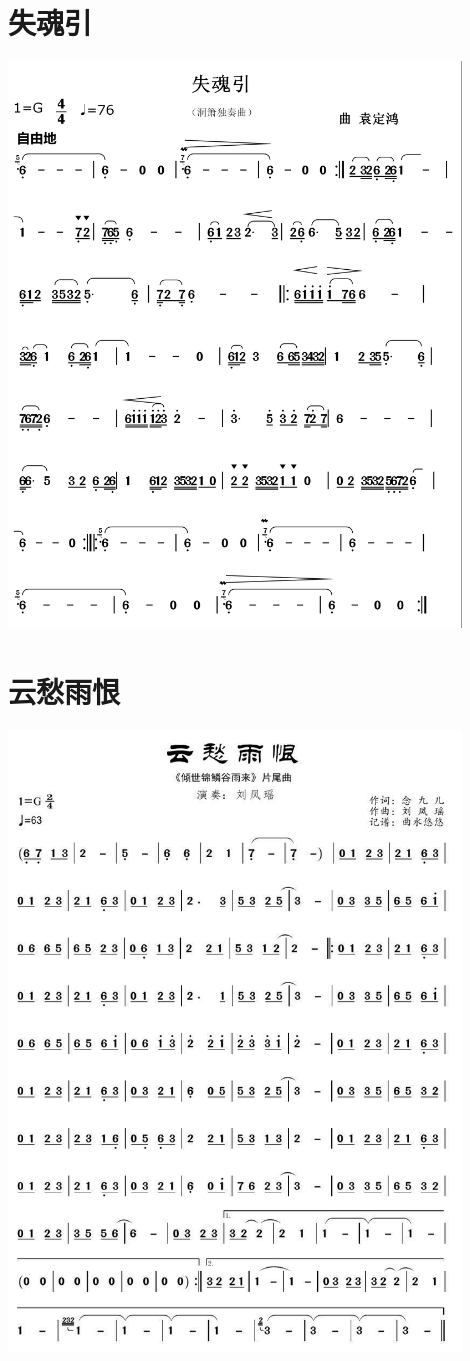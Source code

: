 \documentclass[cn,pad,twocol]{elegantbook}
\begin{document}
\section{失魂引}
    \includegraphics[width=0.9\textwidth]{rpi400/20201226失魂引.png}
\section{云愁雨恨}
    \includegraphics[width=0.9\textwidth]{rpi400/20201226云愁雨恨.png}
\end{document}
